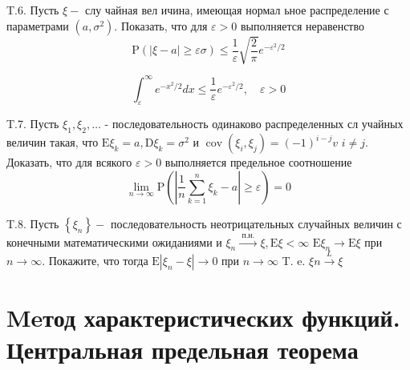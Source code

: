 \documentclass[a4paper,12pt]{article} %
\begin{document}
\begin{example}



T.6. Пусть $\xi-$ слу чайная вел ичина, имеющая нормал ьное распределение с параметрами $\left(a, \sigma^{2}\right) .$ Показать, что для $\varepsilon>0$ выполняется неравенство
$$
\mathrm{P}(|\xi-a| \geq \varepsilon \sigma) \leq \frac{1}{\varepsilon} \sqrt{\frac{2}{\pi}} e^{-\varepsilon^{2} / 2}
$$

$$\int_{\varepsilon}^{\infty} e^{-x^{2} / 2} d x \leq \frac{1}{\varepsilon} e^{-\varepsilon^{2} / 2}, \quad \varepsilon>0$$

\end{example}



\begin{example}

T.7. Пусть $\xi_{1}, \xi_{2}, \ldots$ - последовательность одинаково распределенных сл учайных величин такая, что $\mathrm{E} \xi_{k}=a, \mathrm{D} \xi_{k}=\sigma^{2}$ и $\operatorname{cov}\left(\xi_{i}, \xi_{j}\right)=(-1)^{i-j} v$
$i \neq j .$ 
Доказать, что для всякого $\varepsilon>0$ выполняется предельное соотношение
$$
\lim _{n \rightarrow \infty} \mathrm{P}\left(\left|\frac{1}{n} \sum_{k=1}^{n} \xi_{k}-a\right| \geq \varepsilon\right)=0
$$




\end{example}





\begin{example}


T.8. Пусть $\left\{\xi_{n}\right\}-$ последовательность неотрицательных случайных величин с конечными математическими ожиданиями и $\xi_{n} \stackrel{\text { п.н. }}{\rightarrow} \xi, \mathrm{E} \xi<\infty$ $\mathrm{E} \xi_{n} \rightarrow \mathrm{E} \xi$ при $n \rightarrow \infty .$ Покажите, что тогда $\mathrm{E}\left|\xi_{n}-\xi\right| \rightarrow 0$ при $n \rightarrow \infty$
T. e. $\xi n \stackrel{L}{\rightarrow} \xi$



\end{example}



\section{Meтод характеристических функций. Центральная предельная теорема}
\end{document}
